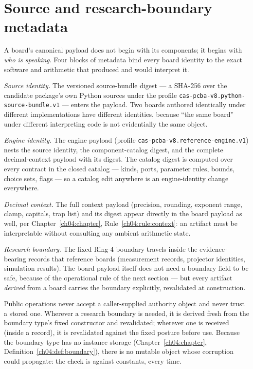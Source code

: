 \section{Source and research-boundary metadata}\label{ch05:sec:metadata}

A board's canonical payload does not begin with its components; it begins
with \emph{who is speaking}. Four blocks of metadata bind every board
identity to the exact software and arithmetic that produced and would
interpret it.

\emph{Source identity.} The versioned source-bundle digest --- a SHA-256
over the candidate package's own Python sources under the profile
\texttt{cas-pcba-v8.python-source-bundle.v1} --- enters the payload. Two
boards authored identically under different implementations have
different identities, because ``the same board'' under different
interpreting code is not evidentially the same object.

\emph{Engine identity.} The engine payload (profile
\texttt{cas-pcba-v8.reference-engine.v1}) nests the source identity, the
component-catalog digest, and the complete decimal-context payload with
its digest. The catalog digest is computed over every contract in the
closed catalog --- kinds, ports, parameter rules, bounds, choice sets,
flags --- so a catalog edit anywhere is an engine-identity change
everywhere.

\emph{Decimal context.} The full context payload (precision, rounding,
exponent range, clamp, capitals, trap list) and its digest appear
directly in the board payload as well, per
Chapter~\ref{ch04:chapter}, Rule~\ref{ch04:rule:context}: an artifact
must be interpretable without consulting any ambient arithmetic state.

\emph{Research boundary.} The fixed Ring-4 boundary travels inside the
evidence-bearing records that reference boards (measurement records,
projector identities, simulation results). The board payload itself does
not need a boundary field to be safe, because of the operational rule of
the next section --- but every artifact \emph{derived} from a board
carries the boundary explicitly, revalidated at construction.

\begin{ruleenv}\label{ch05:rule:boundary}
Public operations never accept a caller-supplied authority object and
never trust a stored one. Wherever a research boundary is needed, it is
derived fresh from the boundary type's fixed constructor and revalidated;
wherever one is received (inside a record), it is revalidated against the
fixed posture before use. Because the boundary type has no instance
storage (Chapter~\ref{ch04:chapter}, Definition~\ref{ch04:def:boundary}),
there is no mutable object whose corruption could propagate: the check is
against constants, every time.
\end{ruleenv}

